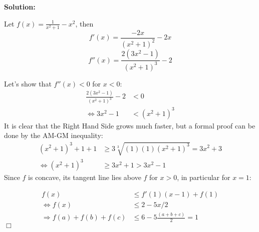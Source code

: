 \documentclass[12pt]{article}
\newenvironment{solution}{%
    \vspace{1em} %
    \noindent\textbf{Solution:}%
}{%
    \par
}
\begin{document}
\begin{solution}
   Let $f(x) = \frac{1}{x^2+1} - x^2$, then
    $$f'(x) = \frac{-2x}{(x^2+1)^2} - 2x$$
    $$f''(x) = \frac{2(3x^2-1)}{(x^2+1)^3}-2$$
    
    Let's show that $f''(x)<0$ for $x<0$:
    \begin{align*}
        \frac{2(3x^2-1)}{(x^2+1)^3}-2 &< 0 \\
        \iff 3x^2-1 &< (x^2+1)^3
    \end{align*}
    \newpage
    It is clear that the Right Hand Side grows much faster, but a formal proof can be done by the AM-GM inequality:
    \begin{align*}
        (x^2+1)^3 + 1 + 1 &\geq 3\sqrt[3]{(1)(1)(x^2+1)^3} = 3x^2+3\\
        \iff (x^2+1)^3 &\geq 3x^2+1 > 3x^2-1
    \end{align*}
    Since $f$ is concave, its tangent line lies above $f$ for $x>0$, in particular for $x=1$:

    \begin{align*}
        f(x) &\leq f'(1)(x-1) + f(1) \\
        \iff f(x) &\leq 2-5x/2 \\
        \Rightarrow f(a)+f(b)+f(c) &\leq 6-5\frac{(a+b+c)}{2}=1
    \end{align*}
    $\Box$
\end{solution}
\end{document}
